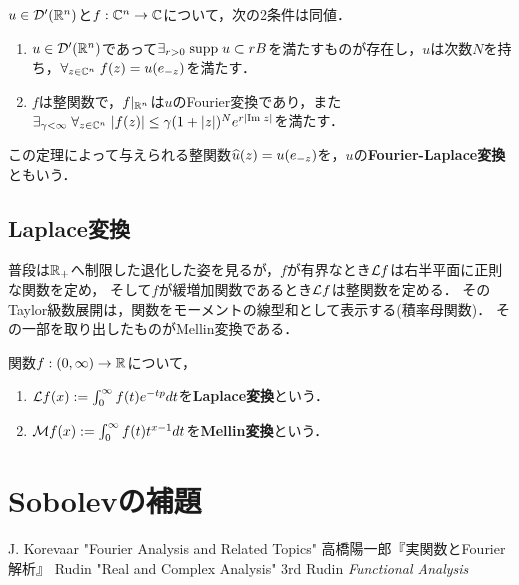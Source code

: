 \documentclass[uplatex,dvipdfmx]{jsreport}
\begin{document}
\begin{theorem}
    $u\in\mathcal{D}'(\mathbb{R}^n)$と$f:\mathbb{C}^n\to\mathbb{C}$について，次の2条件は同値．
    \begin{enumerate}
        \item $u\in\mathcal{D}'(\mathbb{R}^n)$であって$\exists_{r>0}\;\mathrm{supp}\; u\subset rB$を満たすものが存在し，$u$は次数$N$を持ち，$\forall_{z\in\mathbb{C}^n}\;f(z)=u(e_{-z})$を満たす．
        \item $f$は整関数で，$f|_{\mathbb{R}^n}$は$u$のFourier変換であり，また$\exists_{\gamma<\infty}\;\forall_{z\in\mathbb{C}^n}\;\lvert f(z)\rvert\le\gamma(1+\lvert z\rvert)^Ne^{r\lvert\mathrm{Im}\; z\rvert}$を満たす．
    \end{enumerate}
\end{theorem}

\begin{definition}
    この定理によって与えられる整関数$\widehat{u}(z)=u(e_{-z})$を，$u$の\textbf{Fourier-Laplace変換}ともいう．
\end{definition}

\subsection{Laplace変換}

\begin{tcolorbox}[colframe=ForestGreen, colback=ForestGreen!10!white,breakable,colbacktitle=ForestGreen!40!white,coltitle=black,fonttitle=\bfseries\sffamily,
title=]
    普段は$\mathbb{R}_+$へ制限した退化した姿を見るが，$f$が有界なとき$\mathcal{L} f$は右半平面に正則な関数を定め，
    そして$f$が緩増加関数であるとき$\mathcal{L} f$は整関数を定める．
    そのTaylor級数展開は，関数をモーメントの線型和として表示する(積率母関数)．
    その一部を取り出したものがMellin変換である．
\end{tcolorbox}

\begin{definition}
    関数$f:(0,\infty)\to\mathbb{R}$について，
    \begin{enumerate}
        \item $\mathcal{L} f(x):=\int^\infty_0f(t)e^{-tp}dt$を\textbf{Laplace変換}という．
        \item $\mathcal{M} f(x):=\int^\infty_0f(t)t^{x-1}dt$を\textbf{Mellin変換}という．
    \end{enumerate}
\end{definition}

\section{Sobolevの補題}

\begin{thebibliography}{9}
    J. Korevaar "Fourier Analysis and Related Topics"
    高橋陽一郎『実関数とFourier解析』
    Rudin "Real and Complex Analysis" 3rd
    Rudin \textit{Functional Analysis}
\end{thebibliography}
\end{document}
